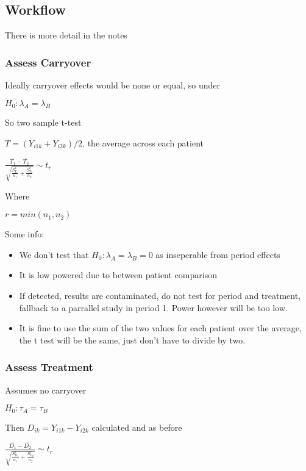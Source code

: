 \documentclass[
  letterpaper,
  DIV=11,
  numbers=noendperiod]{scrreprt}
\providecommand{\tightlist}{%
  \setlength{\itemsep}{0pt}\setlength{\parskip}{0pt}}\usepackage{longtable,booktabs,array}
\begin{document}
\hypertarget{workflow}{%
\subsection{Workflow}\label{workflow}}

There is more detail in the notes

\hypertarget{assess-carryover}{%
\subsubsection{Assess Carryover}\label{assess-carryover}}

Ideally carryover effects would be none or equal, so under

\(H_0 : \lambda_A = \lambda_B\)

So two sample t-test

\(T = (Y_{i1k} +Y_{i2k})/2\), the average across each patient

\(\frac{\bar{T_1} - \bar{T_2}} {\sqrt{  \frac{S^2_{T_1}}{n_1} +  \frac{S^2_{T_2}}{n_2} }} \sim t_r\)

Where

\(r = min(n_1, n_2)\)

Some info:

\begin{itemize}
\tightlist
\item
  We don't test that \(H_0 : \lambda_A = \lambda_B= 0\) as inseperable
  from period effects
\item
  It is low powered due to between patient comparison
\item
  If detected, results are contaminated, do not test for period and
  treatment, fallback to a parrallel study in period 1. Power however
  will be too low.
\item
  It is fine to use the sum of the two values for each patient over the
  average, the t test will be the same, just don't have to divide by
  two.
\end{itemize}

\hypertarget{assess-treatment}{%
\subsubsection{Assess Treatment}\label{assess-treatment}}

Assumes no carryover

\(H_0 : \tau_A = \tau_B\)

Then \(D_{ik} = Y_{i1k} - Y_{i2k}\) calculated and as before

\(\frac{\bar{D_1} - \bar{D_2}} {\sqrt{  \frac{S^2_{D_1}}{n_1} +  \frac{S^2_{D_2}}{n_2} }} \sim t_r\)
\end{document}
